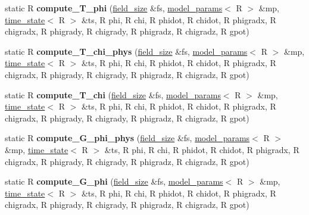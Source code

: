 \begin{DoxyCompactItemize}
\item 
\hypertarget{structgrid__funcs_aacdcb65b1a377908aa13b2af20fb1d4a}{
static R {\bfseries compute\_\-T\_\-phi} (\hyperlink{structfield__size}{field\_\-size} \&fs, \hyperlink{structmodel__params}{model\_\-params}$<$ R $>$ \&mp, \hyperlink{structtime__state}{time\_\-state}$<$ R $>$ \&ts, R phi, R chi, R phidot, R chidot, R phigradx, R chigradx, R phigrady, R chigrady, R phigradz, R chigradz, R gpot)}
\label{structgrid__funcs_aacdcb65b1a377908aa13b2af20fb1d4a}

\item 
\hypertarget{structgrid__funcs_a0d8a5ce997dcb955a54e960f803aa0bb}{
static R {\bfseries compute\_\-T\_\-chi\_\-phys} (\hyperlink{structfield__size}{field\_\-size} \&fs, \hyperlink{structmodel__params}{model\_\-params}$<$ R $>$ \&mp, \hyperlink{structtime__state}{time\_\-state}$<$ R $>$ \&ts, R phi, R chi, R phidot, R chidot, R phigradx, R chigradx, R phigrady, R chigrady, R phigradz, R chigradz, R gpot)}
\label{structgrid__funcs_a0d8a5ce997dcb955a54e960f803aa0bb}

\item 
\hypertarget{structgrid__funcs_ae68b8f6ac20a9625b29a39f6e59d6f7d}{
static R {\bfseries compute\_\-T\_\-chi} (\hyperlink{structfield__size}{field\_\-size} \&fs, \hyperlink{structmodel__params}{model\_\-params}$<$ R $>$ \&mp, \hyperlink{structtime__state}{time\_\-state}$<$ R $>$ \&ts, R phi, R chi, R phidot, R chidot, R phigradx, R chigradx, R phigrady, R chigrady, R phigradz, R chigradz, R gpot)}
\label{structgrid__funcs_ae68b8f6ac20a9625b29a39f6e59d6f7d}

\item 
\hypertarget{structgrid__funcs_a7dd6710638fa2f82c38c33ee91a88e74}{
static R {\bfseries compute\_\-G\_\-phi\_\-phys} (\hyperlink{structfield__size}{field\_\-size} \&fs, \hyperlink{structmodel__params}{model\_\-params}$<$ R $>$ \&mp, \hyperlink{structtime__state}{time\_\-state}$<$ R $>$ \&ts, R phi, R chi, R phidot, R chidot, R phigradx, R chigradx, R phigrady, R chigrady, R phigradz, R chigradz, R gpot)}
\label{structgrid__funcs_a7dd6710638fa2f82c38c33ee91a88e74}

\item 
\hypertarget{structgrid__funcs_a007630f31ee559741783aa0a007641df}{
static R {\bfseries compute\_\-G\_\-phi} (\hyperlink{structfield__size}{field\_\-size} \&fs, \hyperlink{structmodel__params}{model\_\-params}$<$ R $>$ \&mp, \hyperlink{structtime__state}{time\_\-state}$<$ R $>$ \&ts, R phi, R chi, R phidot, R chidot, R phigradx, R chigradx, R phigrady, R chigrady, R phigradz, R chigradz, R gpot)}
\label{structgrid__funcs_a007630f31ee559741783aa0a007641df}


\end{DoxyCompactItemize}
